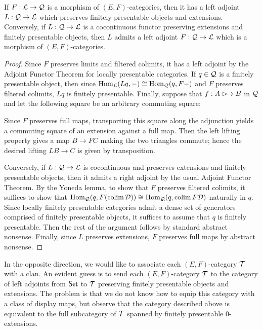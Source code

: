 \documentclass[a4paper]{article}
\begin{document}
\begin{lemma}
  If $F : \mathcal{L} \to \mathcal{Q}$ is a morphism of $(E,F)$-categories, then it has a left adjoint $L : \mathcal{Q} \to \mathcal{L}$ which preserves finitely presentable objects and extensions.
  Conversely, if $L : \mathcal{Q} \to \mathcal{L}$ is a cocontinuous functor preserving extensions and finitely presentable objects, then $L$ admits a left adjoint $F : \mathcal{Q} \to \mathcal{L}$ which is a morphism of $(E,F)$-categories.
\end{lemma}
\begin{proof}
  Since $F$ preserves limits and filtered colimits, it has a left adjoint by the Adjoint Functor Theorem for locally presentable categories.
  If $q \in \mathcal{Q}$ is a finitely presentable object, then since $\operatorname{\mathrm{Hom}_{\mathcal{L}}}(Lq,-) \cong \operatorname{\mathrm{Hom}_{\mathcal{Q}}}(q,F-)$ and $F$ preserves filtered colimits, $Lq$ is finitely presentable.
  Finally, suppose that $f : A \extension B$ in $\mathcal{Q}$ and let the following square be an arbitrary commuting square:
  \begin{center}
  \end{center}
  Since $F$ preserves full maps, transporting this square along the adjunction yields a commuting square of an extension against a full map.
  Then the left lifting property gives a map $B \to FC$ making the two triangles commute; hence the desired lifting $LB \to C$ is given by transposition.

  Conversely, if $L : \mathcal{Q} \to \mathcal{L}$ is cocontinuous and preserves extensions and finitely presentable objects, then it admits a right adjoint by the usual Adjoint Functor Theorem.
  By the Yoneda lemma, to show that $F$ preserves filtered colimits, it suffices to show that $\operatorname{\mathrm{Hom}_{\mathcal{Q}}}(q, F(\operatorname{colim}\mathcal{D})) \cong \operatorname{\mathrm{Hom}_{\mathcal{Q}}}(q, \operatorname{colim} F\mathcal{D})$ naturally in $q$.
  Since locally finitely presentable categories admit a dense set of generators comprised of finitely presentable objects, it suffices to assume that $q$ is finitely presentable.
  Then the rest of the argument follows by standard abstract nonsense.
  Finally, since $L$ preserves extensions, $F$ preserves full maps by abstract nonsense.
\end{proof}

In the opposite direction, we would like to associate each $(E,F)$-category $\mathcal{T}$ with a clan.
An evident guess is to send each $(E,F)$-category $\mathcal{T}$ to the category of left adjoints from $\mathsf{Set}$ to $\mathcal{T}$ preserving finitely presentable objects and extensions.
The problem is that we do not know how to equip this category with a class of display maps, but observe that the category described above is equivalent to the full subcategory of $\mathcal{T}$ spanned by finitely presentable $0$-extensions.
\end{document}
